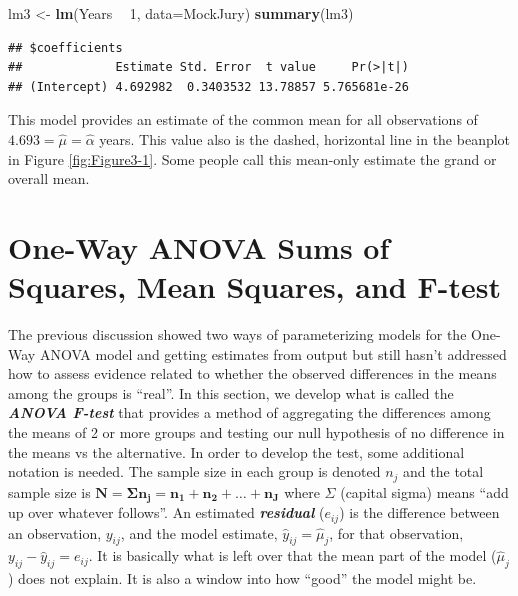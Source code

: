 \documentclass[]{book}
\newenvironment{Shaded}{\begin{snugshade}}{\end{snugshade}}
\newcommand{\KeywordTok}[1]{\textcolor[rgb]{0.13,0.29,0.53}{\textbf{#1}}}
\newcommand{\DataTypeTok}[1]{\textcolor[rgb]{0.13,0.29,0.53}{#1}}
\newcommand{\DecValTok}[1]{\textcolor[rgb]{0.00,0.00,0.81}{#1}}
\newcommand{\StringTok}[1]{\textcolor[rgb]{0.31,0.60,0.02}{#1}}
\newcommand{\OperatorTok}[1]{\textcolor[rgb]{0.81,0.36,0.00}{\textbf{#1}}}
\newcommand{\NormalTok}[1]{#1}
\theoremstyle{definition}
\theoremstyle{definition}
\theoremstyle{remark}
\begin{document}
\begin{Shaded}
\begin{Highlighting}[]
\NormalTok{lm3 <-}\StringTok{ }\KeywordTok{lm}\NormalTok{(Years }\OperatorTok{~}\StringTok{ }\DecValTok{1}\NormalTok{, }\DataTypeTok{data=}\NormalTok{MockJury)}
\KeywordTok{summary}\NormalTok{(lm3)}
\end{Highlighting}
\end{Shaded}

\begin{verbatim}
## $coefficients
##             Estimate Std. Error  t value     Pr(>|t|)
## (Intercept) 4.692982  0.3403532 13.78857 5.765681e-26
\end{verbatim}

This model provides an estimate of the common mean for all observations
of \(4.693 = \hat{\mu} = \hat{\alpha}\) years. This value also is the
dashed, horizontal line in the beanplot in Figure \ref{fig:Figure3-1}.
Some people call this mean-only estimate the grand or overall mean.

\section{One-Way ANOVA Sums of Squares, Mean Squares, and
F-test}\label{section3-3}

The previous discussion showed two ways of parameterizing models for the
One-Way ANOVA model and getting estimates from output but still hasn't
addressed how to assess evidence related to whether the observed
differences in the means among the groups is ``real''. In this section,
we develop what is called the \textbf{\emph{ANOVA F-test}} that provides
a method of aggregating the differences among the means of 2 or more
groups and testing our null hypothesis of no difference in the means vs
the alternative. In order to develop the test, some additional notation
is needed. The sample size in each group is denoted \(n_j\) and the
total sample size is
\(\boldsymbol{N=\Sigma n_j = n_1 + n_2 + \ldots + n_J}\) where
\(\Sigma\) (capital sigma) means ``add up over whatever follows''. An
estimated \textbf{\emph{residual}} (\(e_{ij}\)) is the difference
between an observation, \(y_{ij}\), and the model estimate,
\(\hat{y}_{ij} = \hat{\mu}_j\), for that observation,
\(y_{ij}-\hat{y}_{ij} = e_{ij}\). It is basically what is left over that
the mean part of the model (\(\hat{\mu}_{j}\)) does not explain. It is
also a window into how ``good'' the model might be.
\end{document}
